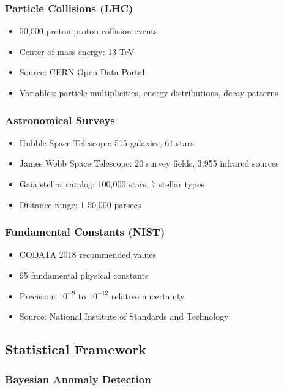 \documentclass[12pt,a4paper]{article}
\begin{document}
\subsubsection{Particle Collisions (LHC)}
\begin{itemize}
\item 50,000 proton-proton collision events
\item Center-of-mass energy: 13 TeV
\item Source: CERN Open Data Portal
\item Variables: particle multiplicities, energy distributions, decay patterns
\end{itemize}

\subsubsection{Astronomical Surveys}
\begin{itemize}
\item Hubble Space Telescope: 515 galaxies, 61 stars
\item James Webb Space Telescope: 20 survey fields, 3,955 infrared sources
\item Gaia stellar catalog: 100,000 stars, 7 stellar types
\item Distance range: 1-50,000 parsecs
\end{itemize}

\subsubsection{Fundamental Constants (NIST)}
\begin{itemize}
\item CODATA 2018 recommended values
\item 95 fundamental physical constants
\item Precision: $10^{-9}$ to $10^{-12}$ relative uncertainty
\item Source: National Institute of Standards and Technology
\end{itemize}

\subsection{Statistical Framework}

\subsubsection{Bayesian Anomaly Detection}
\end{document}
